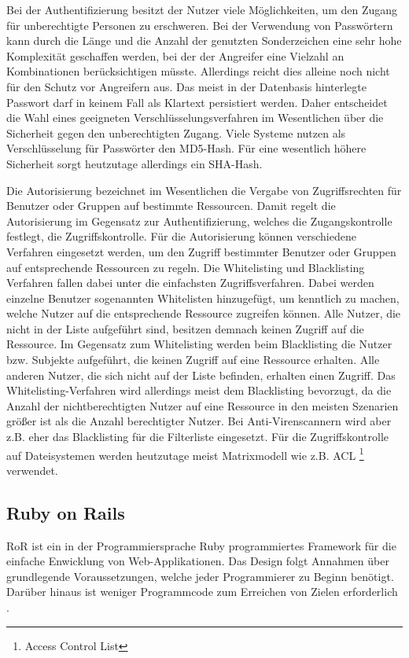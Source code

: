 \begin{k}
Bei der Authentifizierung besitzt der Nutzer viele Möglichkeiten, um den Zugang
für unberechtigte Personen zu erschweren. Bei der Verwendung von Passwörtern
kann durch die Länge und die Anzahl der genutzten Sonderzeichen eine sehr hohe
Komplexität geschaffen werden, bei der der Angreifer eine Vielzahl an
Kombinationen berücksichtigen müsste. Allerdings reicht dies alleine noch nicht
für den Schutz vor Angreifern aus. Das meist in der Datenbasis hinterlegte
Passwort darf in keinem Fall als Klartext persistiert werden. Daher entscheidet
die Wahl eines geeigneten Verschlüsselungsverfahren im
Wesentlichen über die Sicherheit gegen den unberechtigten Zugang. Viele Systeme
nutzen als Verschlüsselung für Passwörter den MD5-Hash. Für eine
wesentlich höhere Sicherheit sorgt heutzutage allerdings ein SHA-Hash.

Die Autorisierung bezeichnet im Wesentlichen die Vergabe von Zugriffsrechten für
Benutzer oder Gruppen auf bestimmte Ressourcen. Damit regelt die Autorisierung
im Gegensatz zur Authentifizierung, welches die Zugangskontrolle festlegt, die
Zugriffskontrolle. Für die Autorisierung können verschiedene Verfahren
eingesetzt werden, um den Zugriff bestimmter Benutzer oder Gruppen auf
entsprechende Ressourcen zu regeln. Die Whitelisting und Blacklisting
Verfahren fallen dabei unter die einfachsten Zugriffsverfahren. Dabei werden
einzelne Benutzer sogenannten Whitelisten hinzugefügt, um kenntlich zu machen,
welche Nutzer auf die entsprechende Ressource zugreifen können. Alle Nutzer, die
nicht in der Liste aufgeführt sind, besitzen demnach keinen Zugriff auf die
Ressource. Im Gegensatz zum Whitelisting werden beim Blacklisting die Nutzer
bzw. Subjekte aufgeführt, die keinen Zugriff auf eine Ressource erhalten. Alle
anderen Nutzer, die sich nicht auf der Liste befinden, erhalten einen Zugriff.
Das Whitelisting-Verfahren wird allerdings meist dem Blacklisting bevorzugt, da
die Anzahl der nichtberechtigten Nutzer auf eine Ressource in den meisten
Szenarien größer ist als die Anzahl berechtigter Nutzer. Bei Anti-Virenscannern
wird aber z.B. eher das Blacklisting für die Filterliste eingesetzt.
Für die Zugriffskontrolle auf Dateisystemen werden heutzutage meist 
Matrixmodell wie z.B. ACL \footnote{Access Control List} verwendet.
\end{k}

\subsection{Ruby on Rails}
\ac{RoR} ist ein in der Programmiersprache Ruby programmiertes Framework für die
einfache Enwicklung von Web-Applikationen. Das Design folgt Annahmen über
grundlegende Voraussetzungen, welche jeder Programmierer zu Beginn benötigt.
Darüber hinaus ist weniger Programmcode zum Erreichen von Zielen
erforderlich \cite{railsGuides:2013}.

